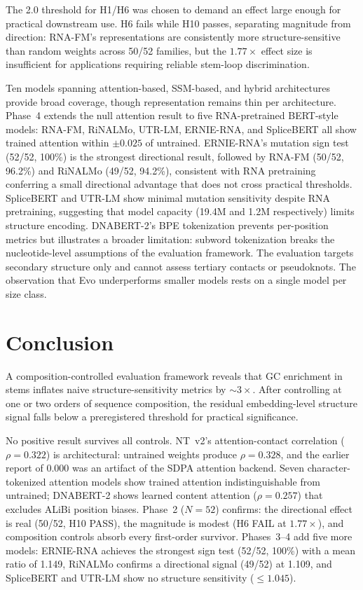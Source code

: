 \documentclass[11pt]{article}
\begin{document}
The 2.0 threshold for H1/H6 was chosen to demand an effect large
enough for practical downstream use.  H6 fails while H10 passes,
separating magnitude from direction: RNA-FM's representations are
consistently more structure-sensitive than random weights across
50/52 families, but the $1.77\times$ effect size is insufficient for
applications requiring reliable stem-loop discrimination.

Ten models spanning attention-based, SSM-based, and hybrid
architectures provide broad coverage, though representation remains
thin per architecture.  Phase~4 extends the null attention result to
five RNA-pretrained BERT-style models: RNA-FM, RiNALMo, UTR-LM,
ERNIE-RNA, and SpliceBERT all show trained attention within $\pm
0.025$ of untrained.  ERNIE-RNA's mutation sign test (52/52, 100\%)
is the strongest directional result, followed by RNA-FM (50/52,
96.2\%) and RiNALMo (49/52, 94.2\%), consistent with RNA pretraining
conferring a small directional advantage that does not cross practical
thresholds.  SpliceBERT and UTR-LM show minimal mutation sensitivity
despite RNA pretraining, suggesting that model capacity (19.4M and
1.2M respectively) limits structure encoding.  DNABERT-2's BPE
tokenization prevents per-position metrics but illustrates a broader
limitation: subword tokenization breaks the nucleotide-level
assumptions of the evaluation framework.  The evaluation targets
secondary structure only and cannot assess tertiary contacts or
pseudoknots.  The observation that Evo underperforms smaller models
rests on a single model per size class.


\section{Conclusion}
\label{sec:conclusion}

A composition-controlled evaluation framework reveals that GC
enrichment in stems inflates naive structure-sensitivity metrics by
${\sim}3\times$.  After controlling at one or two orders of sequence
composition, the residual embedding-level structure signal falls below
a preregistered threshold for practical significance.

No positive result survives all controls.  NT~v2's attention-contact
correlation ($\rho = 0.322$) is architectural: untrained weights
produce $\rho = 0.328$, and the earlier report of $0.000$ was an
artifact of the SDPA attention backend.  Seven character-tokenized
attention models show trained attention indistinguishable from
untrained; DNABERT-2 shows learned content attention ($\rho = 0.257$)
that excludes ALiBi position biases.  Phase~2 ($N = 52$) confirms:
the directional effect is real (50/52, H10 PASS), the magnitude is
modest (H6 FAIL at $1.77\times$), and composition controls absorb
every first-order survivor.  Phases~3--4 add five more models:
ERNIE-RNA achieves the strongest sign test (52/52, 100\%) with a mean
ratio of 1.149, RiNALMo confirms a directional signal (49/52) at
1.109, and SpliceBERT and UTR-LM show no structure sensitivity
($\leq 1.045$).
\end{document}
